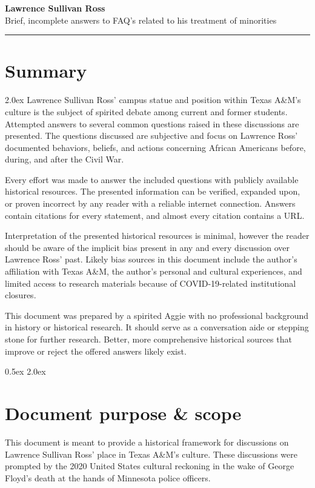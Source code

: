 \documentclass[12pt]{article}
\begin{document}
\Large{\textbf{Lawrence Sullivan Ross \\}}
\large{Brief, incomplete answers to FAQ's related to his treatment of minorities \\}
\rule{\textwidth}{1pt}

\section{Summary}
\parskip 2.0ex
Lawrence Sullivan Ross' campus statue and position within Texas A\&M's culture is the subject of spirited debate among current and former students. Attempted answers to several common questions raised in these discussions are presented. The questions discussed are subjective and focus on Lawrence Ross' documented behaviors, beliefs, and actions concerning African Americans before, during, and after the Civil War. 

Every effort was made to answer the included questions with publicly available historical resources. The presented information can be verified, expanded upon, or proven incorrect by any reader with a reliable internet connection. Answers contain citations for every statement, and almost every citation contains a URL. 

Interpretation of the presented historical resources is minimal, however the reader should be aware of the implicit bias present in any and every discussion over Lawrence Ross' past. Likely bias sources in this document include the author's affiliation with Texas A\&M, the author's personal and cultural experiences, and limited access to research materials because of COVID-19-related institutional closures.

This document was prepared by a spirited Aggie with no professional background in history or  historical research. It should serve as a conversation aide or stepping stone for further research. Better, more comprehensive historical sources that improve or reject the offered answers likely exist. 

\parskip 0.5ex
\newpage
\tableofcontents
\parskip 2.0ex

\newpage
\section{Document purpose \& scope}
This document is meant to provide a historical framework for discussions on Lawrence Sullivan Ross' place in Texas A\&M's culture. These discussions were prompted by the 2020 United States cultural reckoning in the wake of George Floyd's death at the hands of Minnesota police officers. 
\end{document}
